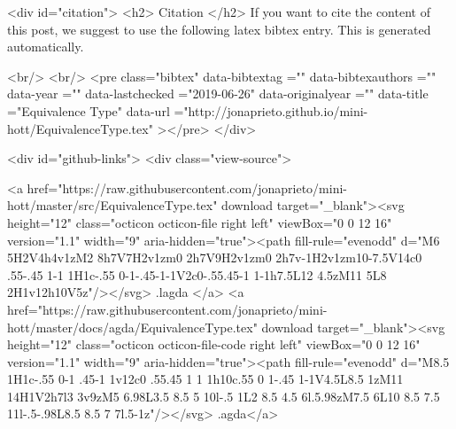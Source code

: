   
  <div id="citation">
  <h2> Citation </h2>
  If you want to cite the content of this post,
  we suggest to use the following latex bibtex entry.
  This is generated automatically.

  <br/>
  <br/>
  <pre class="bibtex"
       data-bibtextag =""
       data-bibtexauthors =""
       data-year =""
       data-lastchecked ="2019-06-26"
       data-originalyear =""
       data-title ="Equivalence Type"
       data-url ="http://jonaprieto.github.io/mini-hott/EquivalenceType.tex"
  ></pre>
  </div>
  

  <div id="github-links">
    <div class="view-source">
      
        <a href="https://raw.githubusercontent.com/jonaprieto/mini-hott/master/src/EquivalenceType.tex" download target="_blank"><svg height="12" class="octicon octicon-file right left" viewBox="0 0 12 16" version="1.1" width="9" aria-hidden="true"><path fill-rule="evenodd" d="M6 5H2V4h4v1zM2 8h7V7H2v1zm0 2h7V9H2v1zm0 2h7v-1H2v1zm10-7.5V14c0 .55-.45 1-1 1H1c-.55 0-1-.45-1-1V2c0-.55.45-1 1-1h7.5L12 4.5zM11 5L8 2H1v12h10V5z"/></svg> .lagda </a>
        <a href="https://raw.githubusercontent.com/jonaprieto/mini-hott/master/docs/agda/EquivalenceType.tex" download target="_blank"><svg height="12" class="octicon octicon-file-code right left" viewBox="0 0 12 16" version="1.1" width="9" aria-hidden="true"><path fill-rule="evenodd" d="M8.5 1H1c-.55 0-1 .45-1 1v12c0 .55.45 1 1 1h10c.55 0 1-.45 1-1V4.5L8.5 1zM11 14H1V2h7l3 3v9zM5 6.98L3.5 8.5 5 10l-.5 1L2 8.5 4.5 6l.5.98zM7.5 6L10 8.5 7.5 11l-.5-.98L8.5 8.5 7 7l.5-1z"/></svg> .agda</a>
      
